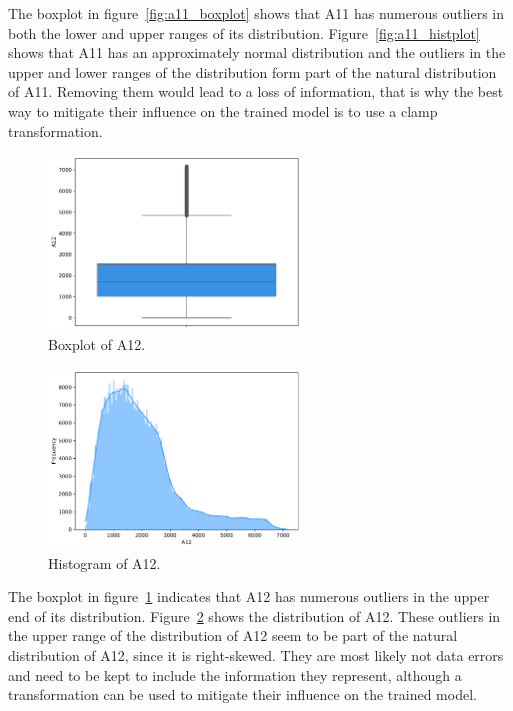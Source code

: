 \documentclass[11pt]{report}
\begin{document}
The boxplot in figure~\ref{fig:a11_boxplot} shows that A11 has numerous outliers in both the lower and upper ranges of its distribution. Figure~\ref{fig:a11_histplot} shows that A11 has an approximately normal distribution and the outliers in the upper and lower ranges of the distribution form part of the natural distribution of A11. Removing them would lead to a loss of information, that is why the best way to mitigate their influence on the trained model is to use a clamp transformation.

\begin{figure}[H]
    \centering
    \includegraphics[width=0.6\textwidth]{images/A12_boxplot.pdf}
    \caption{Boxplot of A12.}
    \label{fig:a12_boxplot}
\end{figure}


\begin{figure}[H]
    \centering
    \includegraphics[width=0.6\textwidth]{images/A12_histplot.pdf}
    \caption{Histogram of A12.}
    \label{fig:a12_histplot}
\end{figure}

The boxplot in figure~\ref{fig:a12_boxplot} indicates that A12 has numerous outliers in the upper end of its distribution. Figure~\ref{fig:a12_histplot} shows the distribution of A12. These outliers in the upper range of the distribution of A12 seem to be part of the natural distribution of A12, since it is right-skewed. They are most likely not data errors and need to be kept to include the information they represent, although a transformation can be used to mitigate their influence on the trained model.
\end{document}
